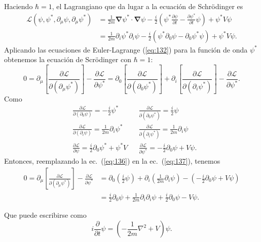 Haciendo $\hbar=1$, el Lagrangiano que da lugar a la ecuaci\'on de Schr\"odinger es
\begin{align}
\label{eq:5tcc}
  \mathcal{L}(\psi,\psi^*,\partial_\mu\psi,\partial_\mu\psi^*)&=\frac{1}{2m}\boldsymbol{\nabla}\psi^*\cdot\boldsymbol{\nabla}\psi-\frac{i}{2}
  \left(
\psi^*\frac{\partial\psi}{\partial t}-\frac{\partial\psi^*}{\partial t}\psi
  \right)+\psi^*V\psi\\
&=\frac{1}{2m}\partial_i\psi^*\partial_i\psi-\frac{i}{2}
  \left(\psi^*\partial_0\psi-\partial_0\psi^*\psi\right)+\psi^*V\psi.\nonumber
\end{align}
Aplicando las ecuaciones de Euler-Lagrange (\ref{eq:132}) para
la funci\'on de onda $\psi^*$ obtenemos la ecuaci\'on de Scr\"odinger con $\hbar=1$:
\begin{equation}
  \label{eq:137}
    0=\partial_\mu\left[\frac{\partial\mathcal{L}}{\partial(\partial_\mu\psi^*)}\right]-\frac{\partial\mathcal{L}}{\partial\psi^*}=
  \partial_0\left[\frac{\partial\mathcal{L}}{\partial(\partial_0\psi^*)}\right]+  
\partial_i\left[\frac{\partial\mathcal{L}}{\partial(\partial_i\psi^*)}\right]-\frac{\partial\mathcal{L}}{\partial\psi^*}.
\end{equation}
Como
\begin{align}
  \label{eq:136}
  &\frac{\partial\mathcal{L}}{\partial(\partial_0\psi)}=-\frac{i}{2}\psi^*&&\frac{\partial\mathcal{L}}{\partial(\partial_0\psi^*)}=\frac{i}{2}\psi\nonumber\\
  &\frac{\partial\mathcal{L}}{\partial(\partial_i\psi)}=\frac{1}{2m}\partial_i\psi^*&&\frac{\partial\mathcal{L}}{\partial(\partial_i\psi^*)}=\frac{1}{2m}\partial_i\psi\\
  &\frac{\partial\mathcal{L}}{\partial\psi}=\frac{i}{2}\partial_0\psi^*+\psi^*V&&\frac{\partial\mathcal{L}}{\partial\psi^*}=-\frac{i}{2}\partial_0\psi+V\psi.\nonumber
\end{align}
Entonces, reemplazando la ec.~(\ref{eq:136}) en la ec.~(\ref{eq:137}), tenemos
\begin{align}
 0=\partial_\mu\left[\frac{\partial\mathcal{L}}{\partial(\partial_\mu\psi^*)}\right]-\frac{\partial\mathcal{L}}{\partial\psi^*}
 &=\partial_0\left(\frac{i}{2}\psi\right)+\partial_i\left(\frac{1}{2m}\partial_i\psi\right)
  -\left(-\frac{i}{2}\partial_0\psi+V\psi\right)\nonumber\\
  &=\frac{i}{2}\partial_0\psi+\frac{1}{2m}\partial_i\partial_i\psi+\frac{i}{2}\partial_0\psi-V\psi.
\end{align}

Que puede escribirse como
\begin{equation}
  \label{eq:133}
  i\frac{\partial}{\partial t}\psi=
  \left(
    -\frac{1}{2m}\nabla^2+V
  \right)\psi.
\end{equation}

